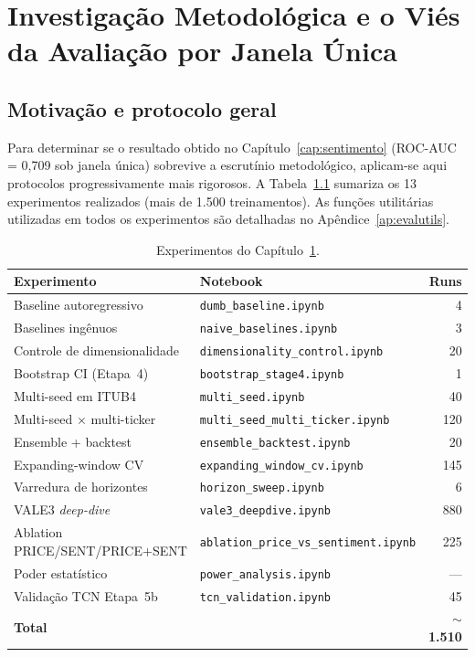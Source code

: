 \chapter{Investigação Metodológica e o Viés da Avaliação por Janela Única}\label{cap:investigacao}

\section{Motivação e protocolo geral}

Para determinar se o resultado obtido no Capítulo~\ref{cap:sentimento} (ROC-AUC = 0,709 sob janela única) sobrevive a escrutínio metodológico, aplicam-se aqui protocolos progressivamente mais rigorosos. A Tabela~\ref{tab:experimentos} sumariza os 13 experimentos realizados (mais de 1.500 treinamentos). As funções utilitárias utilizadas em todos os experimentos são detalhadas no Apêndice~\ref{ap:evalutils}.

\begin{table}[htb]
\centering
\caption{Experimentos do Capítulo~\ref{cap:investigacao}.}\label{tab:experimentos}
\begin{tabular}{llr}
\toprule
\textbf{Experimento} & \textbf{Notebook} & \textbf{Runs} \\
\midrule
Baseline autoregressivo          & \texttt{dumb\_baseline.ipynb}                & 4   \\
Baselines ingênuos               & \texttt{naive\_baselines.ipynb}              & 3   \\
Controle de dimensionalidade     & \texttt{dimensionality\_control.ipynb}       & 20  \\
Bootstrap CI (Etapa~4)           & \texttt{bootstrap\_stage4.ipynb}             & 1   \\
Multi-seed em ITUB4              & \texttt{multi\_seed.ipynb}                   & 40  \\
Multi-seed $\times$ multi-ticker & \texttt{multi\_seed\_multi\_ticker.ipynb}     & 120 \\
Ensemble + backtest              & \texttt{ensemble\_backtest.ipynb}             & 20  \\
Expanding-window CV              & \texttt{expanding\_window\_cv.ipynb}          & 145 \\
Varredura de horizontes          & \texttt{horizon\_sweep.ipynb}                & 6   \\
VALE3 \textit{deep-dive}        & \texttt{vale3\_deepdive.ipynb}               & 880 \\
Ablation PRICE/SENT/PRICE+SENT  & \texttt{ablation\_price\_vs\_sentiment.ipynb} & 225 \\
Poder estatístico                & \texttt{power\_analysis.ipynb}               & --- \\
Validação TCN Etapa~5b           & \texttt{tcn\_validation.ipynb}               & 45  \\
\midrule
\textbf{Total}                   &                                              & \textbf{$\sim$1.510} \\
\bottomrule
\end{tabular}
\end{table}

